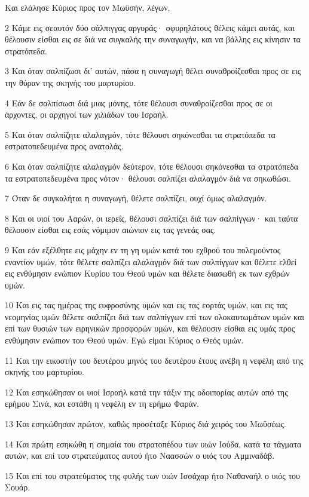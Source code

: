 \par Και ελάλησε Κύριος προς τον Μωϋσήν, λέγων,
\par 2 Κάμε εις σεαυτόν δύο σάλπιγγας αργυράς· σφυρηλάτους θέλεις κάμει αυτάς, και θέλουσιν είσθαι εις σε διά να συγκαλής την συναγωγήν, και να βάλλης εις κίνησιν τα στρατόπεδα.
\par 3 Και όταν σαλπίζωσι δι' αυτών, πάσα η συναγωγή θέλει συναθροίζεσθαι προς σε εις την θύραν της σκηνής του μαρτυρίου.
\par 4 Εάν δε σαλπίσωσι διά μιας μόνης, τότε θέλουσι συναθροίζεσθαι προς σε οι άρχοντες, οι αρχηγοί των χιλιάδων του Ισραήλ.
\par 5 Και όταν σαλπίζητε αλαλαγμόν, τότε θέλουσι σηκόνεσθαι τα στρατόπεδα τα εστρατοπεδευμένα προς ανατολάς.
\par 6 Και όταν σαλπίζητε αλαλαγμόν δεύτερον, τότε θέλουσι σηκόνεσθαι τα στρατόπεδα τα εστρατοπεδευμένα προς νότον· θέλουσι σαλπίζει αλαλαγμόν διά να σηκωθώσι.
\par 7 Όταν δε συγκαλήται η συναγωγή, θέλετε σαλπίζει, ουχί όμως αλαλαγμόν.
\par 8 Και οι υιοί του Ααρών, οι ιερείς, θέλουσι σαλπίζει διά των σαλπίγγων· και ταύτα θέλουσιν είσθαι εις εσάς νόμιμον αιώνιον εις τας γενεάς σας.
\par 9 Και εάν εξέλθητε εις μάχην εν τη γη υμών κατά του εχθρού του πολεμούντος εναντίον υμών, τότε θέλετε σαλπίζει αλαλαγμόν διά των σαλπίγγων και θέλετε ελθεί εις ενθύμησιν ενώπιον Κυρίου του Θεού υμών και θέλετε διασωθή εκ των εχθρών υμών.
\par 10 Και εις τας ημέρας της ευφροσύνης υμών και εις τας εορτάς υμών, και εις τας νεομηνίας υμών θέλετε σαλπίζει διά των σαλπίγγων επί των ολοκαυτωμάτων υμών και επί των θυσιών των ειρηνικών προσφορών υμών, και θέλουσιν είσθαι εις υμάς προς ενθύμησιν ενώπιον του Θεού υμών. Εγώ είμαι Κύριος ο Θεός υμών.
\par 11 Και την εικοστήν του δευτέρου μηνός του δευτέρου έτους ανέβη η νεφέλη από της σκηνής του μαρτυρίου.
\par 12 Και εσηκώθησαν οι υιοί Ισραήλ κατά την τάξιν της οδοιπορίας αυτών από της ερήμου Σινά, και εστάθη η νεφέλη εν τη ερήμω Φαράν.
\par 13 Και εσηκώθησαν πρώτον, καθώς προσέταξε Κύριος διά χειρός του Μωϋσέως.
\par 14 Και πρώτη εσηκώθη η σημαία του στρατοπέδου των υιών Ιούδα, κατά τα τάγματα αυτών, και επί του στρατεύματος αυτού ήτο Ναασσών ο υιός του Αμμιναδάβ.
\par 15 Και επί του στρατεύματος της φυλής των υιών Ισσάχαρ ήτο Ναθαναήλ ο υιός του Σουάρ.
